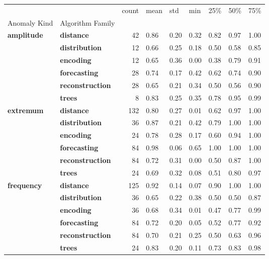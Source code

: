 \begin{table}[p]
\begin{tabular}{llrllllll}
\toprule
 &  & count & mean & std & min & 25\% & 50\% & 75\% \\
Anomaly Kind & Algorithm Family &  &  &  &  &  &  &  \\
\midrule
\multirow[t]{6}{*}{\textbf{amplitude}} & \textbf{distance} & 42 & 0.86 & 0.20 & 0.32 & 0.82 & 0.97 & 1.00 \\
\textbf{} & \textbf{distribution} & 12 & 0.66 & 0.25 & 0.18 & 0.50 & 0.58 & 0.85 \\
\textbf{} & \textbf{encoding} & 12 & 0.65 & 0.36 & 0.00 & 0.38 & 0.79 & 0.91 \\
\textbf{} & \textbf{forecasting} & 28 & 0.74 & 0.17 & 0.42 & 0.62 & 0.74 & 0.90 \\
\textbf{} & \textbf{reconstruction} & 28 & 0.65 & 0.21 & 0.34 & 0.50 & 0.56 & 0.90 \\
\textbf{} & \textbf{trees} & 8 & 0.83 & 0.25 & 0.35 & 0.78 & 0.95 & 0.99 \\
\cline{1-9}
\multirow[t]{6}{*}{\textbf{extremum}} & \textbf{distance} & 132 & 0.80 & 0.27 & 0.01 & 0.62 & 0.97 & 1.00 \\
\textbf{} & \textbf{distribution} & 36 & 0.87 & 0.21 & 0.42 & 0.79 & 1.00 & 1.00 \\
\textbf{} & \textbf{encoding} & 24 & 0.78 & 0.28 & 0.17 & 0.60 & 0.94 & 1.00 \\
\textbf{} & \textbf{forecasting} & 84 & 0.98 & 0.06 & 0.65 & 1.00 & 1.00 & 1.00 \\
\textbf{} & \textbf{reconstruction} & 84 & 0.72 & 0.31 & 0.00 & 0.50 & 0.87 & 1.00 \\
\textbf{} & \textbf{trees} & 24 & 0.69 & 0.32 & 0.08 & 0.51 & 0.80 & 0.97 \\
\cline{1-9}
\multirow[t]{6}{*}{\textbf{frequency}} & \textbf{distance} & 125 & 0.92 & 0.14 & 0.07 & 0.90 & 1.00 & 1.00 \\
\textbf{} & \textbf{distribution} & 36 & 0.65 & 0.22 & 0.38 & 0.50 & 0.50 & 0.87 \\
\textbf{} & \textbf{encoding} & 36 & 0.68 & 0.34 & 0.01 & 0.47 & 0.77 & 0.99 \\
\textbf{} & \textbf{forecasting} & 84 & 0.72 & 0.20 & 0.05 & 0.52 & 0.77 & 0.92 \\
\textbf{} & \textbf{reconstruction} & 84 & 0.70 & 0.21 & 0.25 & 0.50 & 0.63 & 0.96 \\
\textbf{} & \textbf{trees} & 24 & 0.83 & 0.20 & 0.11 & 0.73 & 0.83 & 0.98 \\

\end{tabular}
\end{table}
